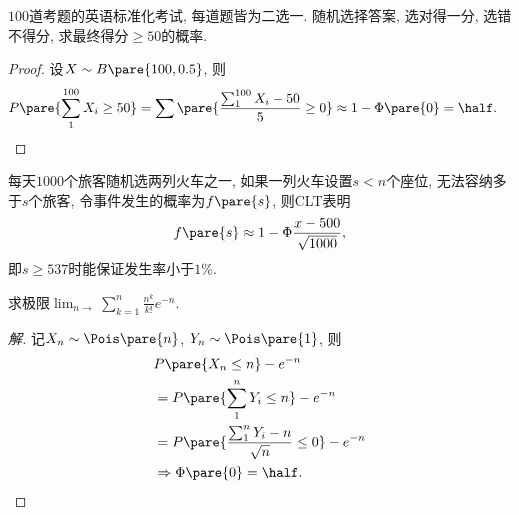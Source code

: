 \documentclass[../Statistics.tex]{subfiles}
\begin{document}
\begin{sample}
    \begin{ex}
        $100$道考题的英语标准化考试, 每道题皆为二选一. 随机选择答案, 选对得一分, 选错不得分, 求最终得分$\ge 50$的概率.
    \end{ex}
    \begin{proof}
        设$X\sim B\pare{100, 0.5}$, 则
        \begin{align*}
            P\pare{\sum_1^{100}X_i \ge 50} &= \sum\pare{\frac{\sum_1^{100}X_i - 50}{5}\ge 0} \approx 1 - \Phi\pare{0} = \half. \qedhere
        \end{align*}
    \end{proof}
\end{sample}
\begin{sample}
    \begin{ex}
        每天$1000$个旅客随机选两列火车之一, 如果一列火车设置$s<n$个座位, 无法容纳多于$s$个旅客, 令事件发生的概率为$f\pare{s}$, 则CLT表明
        \[ f\pare{s} \approx 1-\Phi{\frac{x - 500}{\sqrt{1000}}}, \]
        即$s\ge 537$时能保证发生率小于$1\%$.
    \end{ex}
\end{sample}
\begin{sample}
    \begin{ex}
        求极限$\displaystyle \lim_{n\rightarrow} \sum_{k=1}^n \frac{n^k}{k!}e^{-n}$.
    \end{ex}
    \begin{proof}[解]
        记$X_n \sim \Pois\pare{n}$, $Y_n \sim \Pois\pare{1}$, 则
        \begin{align*}
            & P\pare{X_n \le n} - e^{-n} \\
            &= P\pare{\sum_{1}^n Y_i \le n} - e^{-n} \\
            &= P\pare{\frac{\sum_{1}^n Y_i - n}{\sqrt{n}} \le 0} - e^{-n} \\
            &\Rightarrow \Phi\pare{0} = \half. \qedhere
        \end{align*}
    \end{proof}
\end{sample}


\end{document}
